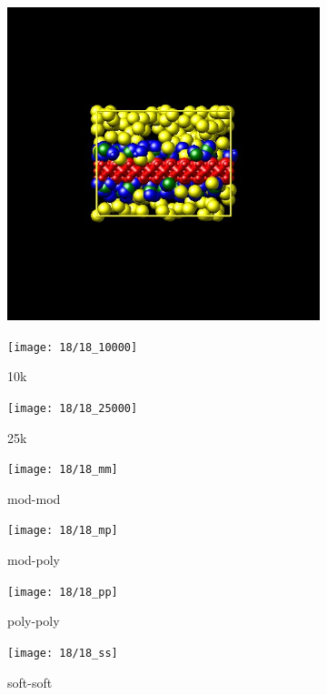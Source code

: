 \documentclass[a4paper]{article}
\begin{document}
\begin{figure}[H]
\begin{subfigure}{0.3\textwidth}
  \centering
  \includegraphics[width=\linewidth,keepaspectratio]{start}
  \caption{}
\end{subfigure}
\begin{subfigure}{0.3\textwidth}
  \centering
  \texttt{[image: 18/18\_10000]}
  \caption{10k}
\end{subfigure}
\begin{subfigure}{0.3\textwidth}
  \centering
  \texttt{[image: 18/18\_25000]}
  \caption{25k}
\end{subfigure}
\caption{}
\label{fig_1}
\end{figure}

\begin{figure}[H]
\begin{subfigure}{0.24\textwidth}
  \centering
  \texttt{[image: 18/18\_mm]}
  \caption{mod-mod}
\end{subfigure}
\begin{subfigure}{0.24\textwidth}
  \centering
  \texttt{[image: 18/18\_mp]}
  \caption{mod-poly}
\end{subfigure}
\begin{subfigure}{0.24\textwidth}
  \centering
  \texttt{[image: 18/18\_pp]}
  \caption{poly-poly}
\end{subfigure}
\begin{subfigure}{0.24\textwidth}
  \centering
  \texttt{[image: 18/18\_ss]}
  \caption{soft-soft}
\end{subfigure}
\caption{}
\label{fig_1}
\end{figure}
\end{document}
